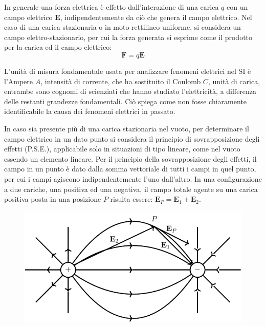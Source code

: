 \documentclass{article}
\newcommand{\vect}[1]{\boldsymbol{\mathbf{#1}}}
\numberwithin{equation}{subsection}
\begin{document}
In generale una forza elettrica è effetto dall'interazione di una carica $q$ con un campo elettrico $\vect{E}$, indipendentemente da ciò che genera il campo elettrico. Nel 
caso di una carica stazionaria o in moto rettilineo uniforme, si considera un campo elettro-stazionario, per cui la forza generata si esprime come il prodotto per la carica 
ed il campo elettrico: 
\begin{equation}
    \vect{F}=q\vect{E}
\end{equation}

L'unità di misura fondamentale usata per analizzare fenomeni elettrici nel SI è l'Ampere $A$, intensità di corrente, che ha sostituito il Coulomb $C$, unità di carica, 
entrambe sono cognomi di scienziati che hanno studiato l'elettricità, a differenza delle restanti grandezze fondamentali. Ciò spiega come non fosse chiaramente 
identificabile la causa dei fenomeni elettrici in passato. 


In caso sia presente più di una carica stazionaria nel vuoto, per determinare il campo elettrico in un dato punto si considera il principio di sovrapposizione degli effetti 
(P.S.E.), applicabile solo in situazioni di tipo lineare, come nel vuoto essendo un elemento lineare. Per il principio della sovrapposizione degli effetti, il campo in un 
punto è dato dalla somma vettoriale di tutti i campi in quel punto, per cui i campi agiscono indipendentemente l'uno dall'altro. In una configurazione a due cariche, una 
positiva ed una negativa, il campo totale agente su una carica positiva posta in una posizione $P$ risulta essere: $\vect{E}_P=\vect{E}_1+\vect{E}_2$. 
\begin{figure}[H]%
    \centering
    \includegraphics{sovrapposizione-campi-elettrici.pdf}
    \label{fig:sovrapposizione-campi-elettrici}
\end{figure}
\end{document}
